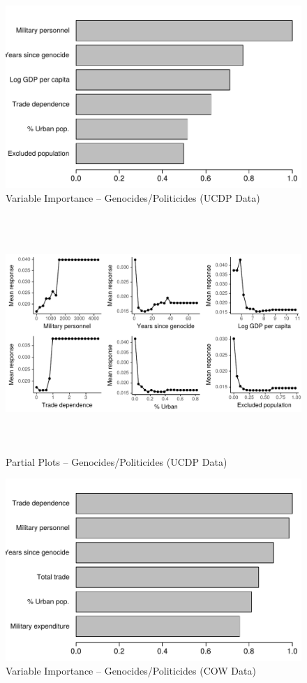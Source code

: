 \documentclass[a4paper,12pt]{article}
\begin{document}
\begin{figure}[H]
    \centering
    \includegraphics{images/drf-gp1.pdf}
    \caption{Variable Importance -- Genocides/Politicides (UCDP Data)}
    \label{fig:my_label}
\end{figure}

\begin{figure}[H]
    \centering
    \includegraphics[width=\textwidth, height=9cm]{images/drfdpp5a.pdf}
    \caption{Partial Plots -- Genocides/Politicides (UCDP Data)}
    \label{fig:my_label}
\end{figure}

\begin{figure}[H]
    \centering
    \includegraphics{images/drf-gp2.pdf}
    \caption{Variable Importance -- Genocides/Politicides (COW Data)}
    \label{fig:my_label}
\end{figure}
\end{document}
